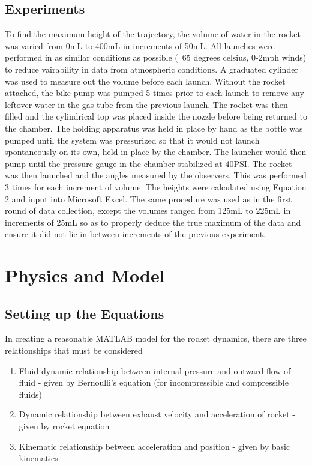 \documentclass[12pt]{article}
\begin{document}
    \subsection{Experiments}
    To find the maximum height of the trajectory, the volume of water in the rocket was varied from 0mL to 400mL in increments of 50mL. All launches were performed in as similar conditions as possible (~65 degrees celsius, 0-2mph winds) to reduce vairability in data from atmospheric conditions. 
A graduated cylinder was used to measure out the volume before each launch. Without the rocket attached, the bike pump was pumped 5 times prior to each launch to remove any leftover water in the gas tube from the previous launch. The rocket was then filled and the cylindrical top was placed inside the nozzle before being returned to the chamber. The holding apparatus was held in place by hand as the bottle was pumped until the system was pressurized so that it would not launch spontaneously on its own, held in place by the chamber. The launcher would then pump until the pressure gauge in the chamber stabilized at 40PSI. The rocket was then launched and the angles measured by the observers. This was performed 3 times for each increment of volume. The heights were calculated using Equation 2 and input into Microsoft Excel.
    The same procedure was used as in the first round of data collection, except the volumes ranged from 125mL to 225mL in increments of 25mL so as to properly deduce the true maximum of the data and ensure it did not lie in between increments of the previous experiment.
 \section{Physics and Model}
 \subsection{Setting up the Equations}
  In creating a reasonable MATLAB model for the rocket dynamics, there are
  three relationships that must be considered
  \begin{enumerate}
  \item{Fluid dynamic relationship between internal pressure and 
  outward flow of fluid - given by Bernoulli's equation (for incompressible and compressible fluids)}
  \item{Dynamic relationship between exhaust velocity and acceleration of rocket - given by rocket equation}
  \item{Kinematic relationship between acceleration and position - given by basic kinematics}
\end{enumerate}
  
\end{document}
